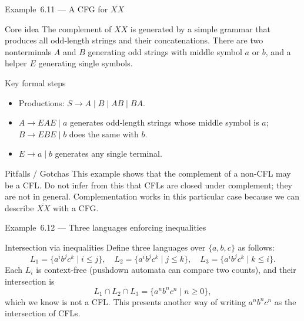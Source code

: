\begin{frame}[t]{Example 6.11 — A CFG for $\overline{XX}$}
  \begin{tblock}{Core idea}
    The complement of $XX$ is generated by a simple grammar that
    produces all odd‑length strings and their concatenations.  There are
    two nonterminals $A$ and $B$ generating odd strings with middle
    symbol $a$ or $b$, and a helper $E$ generating single symbols.
  \end{tblock}
  \begin{tblock}{Key formal steps}
    \begin{itemize}
      \item Productions: $S \rightarrow A \mid B \mid AB \mid BA$.
      \item $A \rightarrow E A E \mid a$ generates odd‑length strings
        whose middle symbol is $a$; $B \rightarrow E B E \mid b$ does the
        same with $b$.
      \item $E \rightarrow a \mid b$ generates any single terminal.
    \end{itemize}
  \end{tblock}
  \begin{talert}{Pitfalls / Gotchas}
    This example shows that the complement of a non‑CFL may be a CFL.
    Do not infer from this that CFLs are closed under complement; they
    are not in general.  Complementation works in this particular case
    because we can describe $\overline{XX}$ with a CFG.
  \end{talert}
  \label{fr:6.2-07}
\end{frame}

\begin{frame}[t]{Example 6.12 — Three languages enforcing inequalities}
  \begin{texample}{Intersection via inequalities}
    Define three languages over $\{a,b,c\}$ as follows:
    \[
      L_1 = \{a^i b^j c^k \mid i \le j\},\quad
      L_2 = \{a^i b^j c^k \mid j \le k\},\quad
      L_3 = \{a^i b^j c^k \mid k \le i\}.
    \]
    Each $L_i$ is context‑free (pushdown automata can compare two
    counts), and their intersection is
    \[
      L_1 \cap L_2 \cap L_3 = \{a^n b^n c^n \mid n\ge 0\},
    \]
    which we know is not a CFL.  This presents another way of writing
    $a^n b^n c^n$ as the intersection of CFLs.
  \end{texample}
  \label{fr:6.2-08}
\end{frame}

